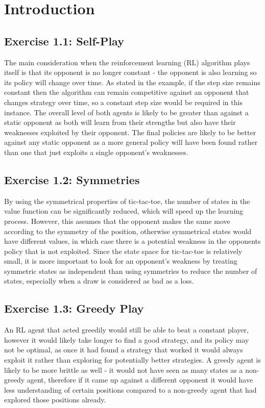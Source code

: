 \section{Introduction}

\subsection*{Exercise 1.1: Self-Play}

The main consideration when the reinforcement learning (RL) algorithm plays itself is that its opponent is no longer constant - the opponent is also learning so its policy will change over time. As stated in the example, if the step size remains constant then the algorithm can remain competitive against an opponent that changes strategy over time, so a constant step size would be required in this instance. The overall level of both agents is likely to be greater than against a static opponent as both will learn from their strengths but also have their weaknesses exploited by their opponent. The final policies are likely to be better against any static opponent as a more general policy will have been found rather than one that just exploits a single opponent's weaknesses. 

\subsection*{Exercise 1.2: Symmetries}

By using the symmetrical properties of tic-tac-toe, the number of states in the value function can be significantly reduced, which will speed up the learning process. However, this assumes that the opponent makes the same move according to the symmetry of the position, otherwise symmetrical states would have different values, in which case there is a potential weakness in the opponents policy that is not exploited. Since the state space for tic-tac-toe is relatively small, it is more important to look for an opponent's weakness by treating symmetric states as independent than using symmetries to reduce the number of states, especially when a draw is considered as bad as a loss.   

\subsection*{Exercise 1.3: Greedy Play}

An RL agent that acted greedily would still be able to beat a constant player, however it would likely take longer to find a good strategy, and its policy may not be optimal, as once it had found a strategy that worked it would always exploit it rather than exploring for potentially better strategies. A greedy agent is likely to be more brittle as well - it would not have seen as many states as a non-greedy agent, therefore if it came up against a different opponent it would have less understanding of certain positions compared to a non-greedy agent that had explored those positions already. 

